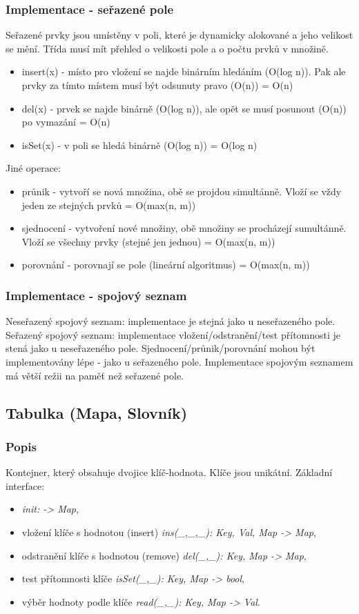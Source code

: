\documentclass{szzclass}
\begin{document}
\subsubsection{Implementace - seřazené pole}
Seřazené prvky jsou umístěny v poli, které je dynamicky alokované a jeho velikost se mění. Třída musí mít přehled o velikosti pole
a o počtu prvků v množině.
\begin{itemize}
    \item insert(x) - místo pro vložení se najde binárním hledáním (O(log n)). Pak ale prvky za tímto místem musí být odsunuty pravo (O(n)) = O(n)
    \item del(x) - prvek se najde binárně (O(log n)), ale opět se musí posunout (O(n)) po vymazání = O(n)
    \item isSet(x) - v poli se hledá binárně (O(log n)) = O(log n)
\end{itemize}
Jiné operace:
\begin{itemize}
    \item průnik - vytvoří se nová množina, obě se projdou simultánně. Vloží se vždy jeden ze stejných prvků = O(max(n, m))
    \item sjednocení - vytvoření nové množiny, obě množiny se procházejí sumultánně. Vloží se všechny prvky (stejné jen jednou) = O(max(n, m))
    \item porovnání - porovnají se pole (lineární algoritmus) = O(max(n, m))
\end{itemize}
\subsubsection{Implementace - spojový seznam}
Neseřazený spojový seznam: implementace je stejná jako u neseřazeného pole.\newline
Seřazený spojový seznam: implementace vložení/odstranění/test přítomnosti je stená jako u neseřazeného pole. Sjednocení/průnik/porovnání mohou být
implementovány lépe - jako u seřazeného pole.\newline
Implementace spojovým seznamem má větší režii na paměť než seřazené pole.


\subsection{Tabulka (Mapa, Slovník)}
\subsubsection{Popis}
Kontejner, který obsahuje dvojice klíč-hodnota. Klíče jsou unikátní. Základní interface:
\begin{itemize}
    \item \textit{init: -> Map},
    \item vložení klíče s hodnotou (insert) \textit{ins(_,_,_): Key, Val, Map -> Map},
    \item odstranění klíče s hodnotou (remove) \textit{del(_,_): Key, Map -> Map},
    \item test přítomnosti klíče \textit{isSet(_,_): Key, Map -> bool},
    \item výběr hodnoty podle klíče \textit{read(_,_): Key, Map -> Val}.
\end{itemize}
\end{document}
